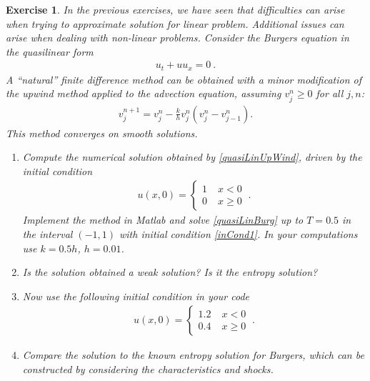 \documentclass[10pt,letterpaper]{article}
\theoremstyle{break}
\newtheorem{exercise}{Exercise}
\begin{document}
\begin{exercise}
	In the previous exercises, we have seen that difficulties can arise when trying to approximate solution for linear problem. Additional issues can arise when dealing with non-linear problems. Consider the Burgers equation in the quasilinear form
	\begin{gather} \label{quasiLinBurg}
		u_{t}+uu_{x}=0\ .
	\end{gather}
	A ``natural'' finite difference method can be obtained with a minor modification of the upwind method applied to the advection equation, assuming $v_{j}^{n}\geq0$ for all $j,n$:
	\begin{gather} \label{quasiLinUpWind}
		v_{j}^{n+1}=v_{j}^{n}-\frac{k}{h}v_{j}^{n}\left(v_{j}^{n} -v_{j-1}^{n}\right).
	\end{gather}
	This method converges on smooth solutions.
	\begin{enumerate}
		\item
		Compute the numerical solution obtained by \eqref{quasiLinUpWind}, driven by the initial condition
		\begin{gather} \label{inCond1}
			u(x,0)=\begin{cases}
					1\; & x<0\\
					0\; & x\geq0
				\end{cases}\ .
		\end{gather}
		Implement the method in Matlab and solve \eqref{quasiLinBurg} up to $T=0.5$ in the interval $(-1,1)$ with initial condition \eqref{inCond1}. In your computations use $k=0.5h$, $h=0.01$.


		\item
		Is the solution obtained a weak solution? Is it the entropy
		solution?

		\item
		Now use the following initial condition in your code 
		\begin{gather} \label{inCond2}
			u\left(x,0\right)=\begin{cases}
					1.2\; & x<0\\
					0.4\; & x\geq0
				\end{cases}\ .
		\end{gather}

		\item
		Compare the solution to the known entropy solution for Burgers, which can be constructed by considering the characteristics and shocks.
	\end{enumerate}
\end{exercise}
\end{document}
